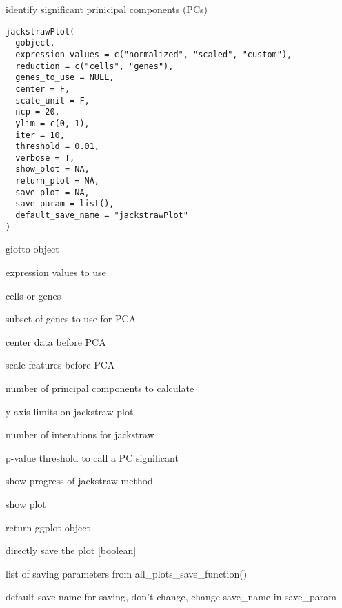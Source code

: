 \documentclass[a4paper]{book}
\begin{document}
%
\begin{Description}\relax
identify significant prinicipal components (PCs)
\end{Description}
%
\begin{Usage}
\begin{verbatim}
jackstrawPlot(
  gobject,
  expression_values = c("normalized", "scaled", "custom"),
  reduction = c("cells", "genes"),
  genes_to_use = NULL,
  center = F,
  scale_unit = F,
  ncp = 20,
  ylim = c(0, 1),
  iter = 10,
  threshold = 0.01,
  verbose = T,
  show_plot = NA,
  return_plot = NA,
  save_plot = NA,
  save_param = list(),
  default_save_name = "jackstrawPlot"
)
\end{verbatim}
\end{Usage}
%
\begin{Arguments}
\begin{ldescription}
\item[\code{gobject}] giotto object

\item[\code{expression\_values}] expression values to use

\item[\code{reduction}] cells or genes

\item[\code{genes\_to\_use}] subset of genes to use for PCA

\item[\code{center}] center data before PCA

\item[\code{scale\_unit}] scale features before PCA

\item[\code{ncp}] number of principal components to calculate

\item[\code{ylim}] y-axis limits on jackstraw plot

\item[\code{iter}] number of interations for jackstraw

\item[\code{threshold}] p-value threshold to call a PC significant

\item[\code{verbose}] show progress of jackstraw method

\item[\code{show\_plot}] show plot

\item[\code{return\_plot}] return ggplot object

\item[\code{save\_plot}] directly save the plot [boolean]

\item[\code{save\_param}] list of saving parameters from all\_plots\_save\_function()

\item[\code{default\_save\_name}] default save name for saving, don't change, change save\_name in save\_param
\end{ldescription}
\end{Arguments}
\end{document}
